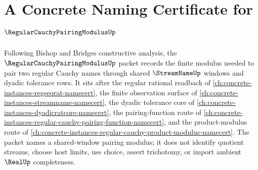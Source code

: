 \chapter{A Concrete Naming Certificate for $\RegularCauchyPairingModulusUp$}
\label{ch:concrete-instances-regular-cauchy-pairing-modulus-namecert}

Following Bishop and Bridges constructive analysis, the $\RegularCauchyPairingModulusUp$ packet records the finite modulus needed to pair two regular Cauchy names through shared $\StreamNameUp$ windows and dyadic tolerance rows. It sits after the regular rational readback of \autoref{ch:concrete-instances-regseqrat-namecert}, the finite observation surface of \autoref{ch:concrete-instances-streamname-namecert}, the dyadic tolerance core of \autoref{ch:concrete-instances-dyadicratcore-namecert}, the pairing-function route of \autoref{ch:concrete-instances-regular-cauchy-pairing-function-namecert}, and the product-modulus route of \autoref{ch:concrete-instances-regular-cauchy-product-modulus-namecert}. The packet names a shared-window pairing modulus; it does not identify quotient streams, choose host limits, use choice, assert trichotomy, or import ambient $\RealUp$ completeness.


